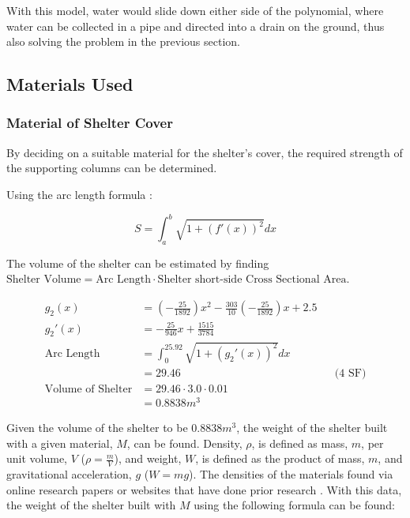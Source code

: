 \documentclass[a4paper,titlepage]{article}
\begin{document}
With this model, water would slide down either side of the polynomial, where water can be collected in a pipe and directed into a drain on the ground, thus also solving the problem in the previous section.

\subsection{Materials Used}\label{sec:Mathematical Model:Materials Used}

\subsubsection{Material of Shelter Cover}

By deciding on a suitable material for the shelter's cover, the required strength of the supporting columns can be determined.

Using the arc length formula \cite{mathisfun-arclength}:

\begin{equation}
    S=\int_a^b\sqrt{1+(f'(x))^2}dx
\end{equation}

The volume of the shelter can be estimated by finding $\text{Shelter Volume}=\text{Arc Length}\cdot\text{Shelter short-side Cross Sectional Area}$.

\begin{align}
    g_2(x)&=\left(-\frac{25}{1892}\right)x^{2}-\frac{303}{10}\left(-\frac{25}{1892}\right)x+2.5\\
    g_2'(x)&=-\frac{25}{946}x+\frac{1515}{3784}\\
    \text{Arc Length}&=\int_0^{25.92}\sqrt{1+(g_2'(x))^2}dx\\
    &=29.46&&\text{(4 SF)}\\
    \text{Volume of Shelter}&=29.46\cdot3.0\cdot0.01\\
    &=0.8838\si{m^3}
\end{align}

Given the volume of the shelter to be $0.8838\si{m^3}$, the weight of the shelter built with a given material, $M$, can be found. Density, $\rho$, is defined as mass, $m$, per unit volume, $V$ ($\rho=\frac{m}V$), and weight, $W$, is defined as the product of mass, $m$, and gravitational acceleration, $g$ ($W=mg$). The densities of the materials found via online research papers or websites that have done prior research \cite{anupoju-density}. With this data, the weight of the shelter built with $M$ using the following formula can be found:
\end{document}
